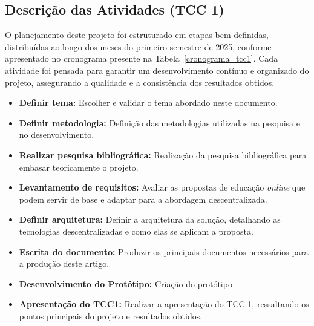 \subsection{Descrição das Atividades (TCC 1)}
O planejamento deste projeto foi estruturado em etapas bem definidas, distribuídas ao longo dos meses do primeiro semestre de 2025, conforme apresentado no cronograma presente na Tabela~\ref{cronograma_tcc1}. Cada atividade foi pensada para garantir um desenvolvimento contínuo e organizado do projeto, assegurando a qualidade e a consistência dos resultados obtidos.

\begin{itemize}
    \item \textbf{Definir tema:} Escolher e validar o tema abordado neste documento.
    \item \textbf{Definir metodologia:} Definição das metodologias utilizadas na pesquisa e no desenvolvimento.
    \item \textbf{Realizar pesquisa bibliográfica:} Realização da pesquisa bibliográfica para embasar teoricamente o projeto.
    \item \textbf{Levantamento de requisitos:} Avaliar as propostas de educação \textit{online} que podem servir de base e adaptar para a abordagem descentralizada.
    \item \textbf{Definir arquitetura:} Definir a arquitetura da solução, detalhando as tecnologias descentralizadas e como elas se aplicam a proposta.
    \item \textbf{Escrita do documento:} Produzir os principais documentos necessários para a produção deste artigo.
    \item \textbf{Desenvolvimento do Protótipo:} Criação do protótipo 
    \item \textbf{Apresentação do TCC1:} Realizar a apresentação do TCC 1, ressaltando os pontos principais do projeto e resultados obtidos.
\end{itemize}

